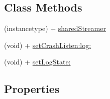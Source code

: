 \subsection*{Class Methods}
\begin{DoxyCompactItemize}
\item 
(instancetype) + \hyperlink{interface_c_c_streamer_basic_a8bb923e9c31c4bb3a75e22117464d0aa}{shared\+Streamer}
\item 
(void) + \hyperlink{interface_c_c_streamer_basic_ac720b0a4b258eebdc14ab97bac4dc42d}{set\+Crash\+Listen\+:log\+:}
\item 
(void) + \hyperlink{interface_c_c_streamer_basic_a7a39b2d3550aba9f219aa0fb9d88e860}{set\+Log\+State\+:}
\end{DoxyCompactItemize}
\subsection*{Properties}
